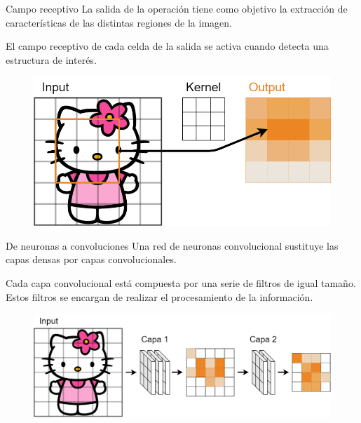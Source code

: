 \begin{frame}{Campo receptivo}
La salida de la \alert{operación} tiene como objetivo la \alert{extracción de características} de las distintas \alert{regiones de la imagen}.

El \alert{campo receptivo} de cada celda de la salida se \alert{activa} cuando detecta una \alert{estructura de interés}.

\begin{figure}
    \centering
    \includegraphics[width=\textwidth]{Slides/figures/Tema 3/ReceptiveActivation_1.png}
\end{figure}
\end{frame}

\begin{frame}{De neuronas a convoluciones}
Una \alert{red de neuronas} convolucional sustituye las capas \alert{densas} por capas \alert{convolucionales}.

Cada capa convolucional está compuesta por una \alert{serie} de \alert{filtros} de igual tamaño. Estos filtros se encargan de realizar el procesamiento de la información.

\begin{figure}
    \centering
    \includegraphics[width=\textwidth]{Slides/figures/Tema 3/CNN_Net.png}
\end{figure}
\end{frame}

